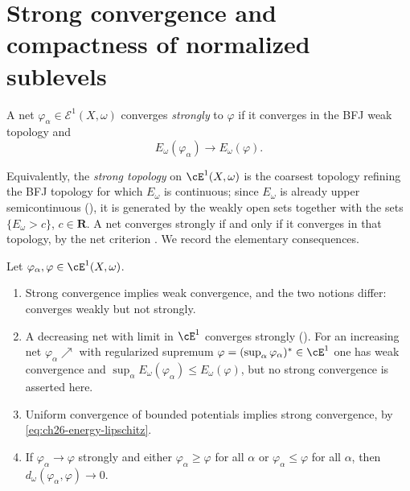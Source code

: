 \section{Strong convergence and compactness of normalized sublevels}
\label{sec:ch26-strong}

\begin{definition}
A net \(\varphi_\alpha\in\mathcal E^1(X,\omega)\) converges
\emph{strongly} to \(\varphi\) if it converges in the BFJ weak topology and
\[
                   E_\omega(\varphi_\alpha)\to E_\omega(\varphi).
\]
\end{definition}

Equivalently, the \emph{strong topology} on \(\cE^1(X,\omega)\) is the
coarsest topology refining the BFJ topology for which \(E_\omega\) is
continuous; since \(E_\omega\) is already upper semicontinuous
(), it is generated by the weakly open sets
together with the sets \(\{E_\omega>c\}\), \(c\in\mathbf R\).  A net
converges strongly if and only if it converges in that topology, by the net
criterion .  We record the elementary consequences.

\begin{proposition}
\label{prop:ch26-strong-basic}
Let \(\varphi_\alpha,\varphi\in\cE^1(X,\omega)\).
\begin{enumerate}
\item\label{itm:ch26-strong:weak}
 Strong convergence implies weak convergence, and the two notions differ:
  converges weakly but not strongly.
\item\label{itm:ch26-strong:monotone}
 A decreasing net with limit in \(\cE^1\) converges strongly
 ().  For an increasing net
 \(\varphi_\alpha\nearrow\) with regularized supremum
 \(\varphi=(\sup_\alpha\varphi_\alpha)^*\in\cE^1\) one has weak convergence
 and \(\sup_\alpha E_\omega(\varphi_\alpha)\leq E_\omega(\varphi)\), but no
 strong convergence is asserted here.
\item\label{itm:ch26-strong:uniform}
 Uniform convergence of bounded potentials implies strong convergence, by
 \eqref{eq:ch26-energy-lipschitz}.
\item\label{itm:ch26-strong:gauge}
 If \(\varphi_\alpha\to\varphi\) strongly and either
 \(\varphi_\alpha\geq\varphi\) for all \(\alpha\) or
 \(\varphi_\alpha\leq\varphi\) for all \(\alpha\), then
 \(d_\omega(\varphi_\alpha,\varphi)\to0\).
\end{enumerate}
\end{proposition}

